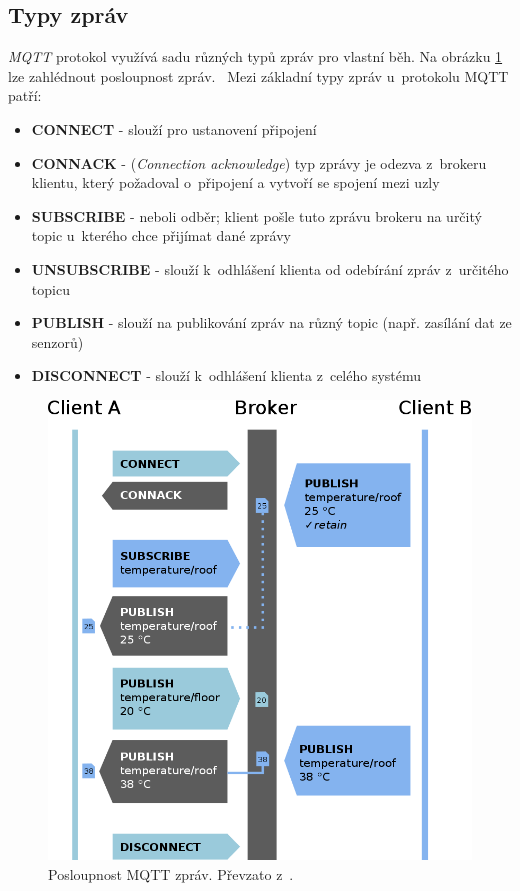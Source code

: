 \subsection*{Typy zpráv}
\emph{MQTT} protokol využívá sadu různých typů zpráv pro vlastní běh. Na obrázku \ref{figure:mqtt_flow} lze zahlédnout posloupnost zpráv.~\cite{wiki:mqtt}
Mezi základní typy zpráv u~protokolu MQTT patří:
\begin{itemize}
  \item \textbf{CONNECT} - slouží pro ustanovení připojení
  \item \textbf{CONNACK} - (\emph{Connection acknowledge}) typ zprávy je odezva z~brokeru klientu, který požadoval o~připojení a vytvoří se spojení mezi uzly
  \item \textbf{SUBSCRIBE} - neboli odběr; klient pošle tuto zprávu brokeru na určitý topic u~kterého chce přijímat dané zprávy
  \item \textbf{UNSUBSCRIBE} - slouží k~odhlášení klienta od odebírání zpráv z~určitého topicu
  \item \textbf{PUBLISH} - slouží na publikování zpráv na různý topic (např. zasílání dat ze senzorů)
  \item \textbf{DISCONNECT} - slouží k~odhlášení klienta z~celého systému
\end{itemize}

\begin{figure}[ht]
  \centering
  \includegraphics[width=.7 \linewidth]{obrazky-figures/mqtt_flow.png}
  \caption{Posloupnost MQTT zpráv. Převzato z~\cite{wiki:mqtt}.}
  \label{figure:mqtt_flow}
\end{figure}

